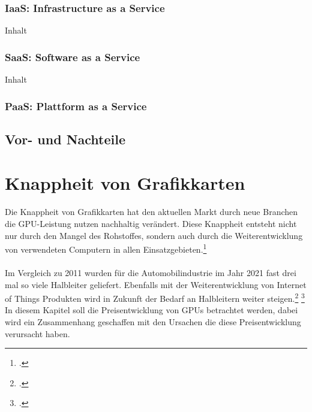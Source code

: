 \documentclass[12pt,toc=bib,toc=listof]{scrreprt}
\begin{document}

\subsection{IaaS: Infrastructure as a Service}
\label{sec:IaaS: Infrastructure as a Service}

Inhalt

\subsection{SaaS: Software as a Service}
\label{sec:SaaS: Software as a Service}

Inhalt

\subsection{PaaS: Plattform as a Service}
\label{sec:PaaS: Plattform as a Service}


\section{Vor- und Nachteile}
\label{Vor- und Nachteile}

\chapter{Knappheit von Grafikkarten} %
\label{sec:Knappheit von Grafikkarten}

Die Knappheit von Grafikkarten hat den
aktuellen Markt durch neue Branchen die GPU-Leistung nutzen nachhaltig verändert.
Diese Knappheit entsteht nicht nur durch den Mangel des Rohstoffes, sondern auch durch die 
Weiterentwicklung von verwendeten Computern in allen Einsatzgebieten.\footcite [Vgl.] []{Voas.2021}
\\
\\
Im Vergleich zu 2011 wurden für die Automobilindustrie im Jahr 2021 fast drei mal so viele
Halbleiter geliefert. Ebenfalls mit der Weiterentwicklung von Internet of Things Produkten wird in
Zukunft der Bedarf an Halbleitern weiter steigen.\footcite [Vgl.] []{Bill_McClean} \footcite [Vgl.] []{Voas.2021} 
\\In diesem Kapitel soll die Preisentwicklung von GPUs betrachtet werden, dabei wird 
ein Zusammenhang geschaffen mit den Ursachen die diese Preisentwicklung 
verursacht haben.
\\ %
\end{document}
